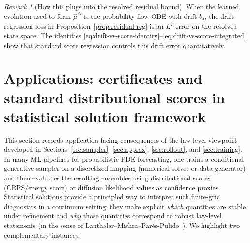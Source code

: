 \documentclass{article}
\numberwithin{equation}{section}
\theoremstyle{plain}
\theoremstyle{definition}
\theoremstyle{remark}
\newtheorem{remark}[theorem]{Remark}
\begin{document}
\begin{remark}[How this plugs into the resolved residual bound]
When the learned evolution used to form $\widehat\mu^\Delta_\cdot$ is the probability-flow ODE with drift $b_\theta$,
the drift regression loss in Proposition~\ref{prop:residual-reg} is an $L^2$ error on the resolved state space.
The identities \eqref{eq:drift-vs-score-identity}--\eqref{eq:drift-vs-score-integrated} show that standard score regression
controls this drift error quantitatively.
\end{remark}



\section{Applications: certificates and standard distributional scores in statistical solution framework}
\label{sec:applications}

This section records application-facing consequences of the law-level viewpoint developed in
Sections~\ref{sec:sampler}, \ref{sec:approx}, \ref{sec:rollout}, and \ref{sec:training}.
In many ML pipelines for probabilistic PDE forecasting, one trains a conditional generative sampler on a discretized
mapping (numerical solver or data generator) and then evaluates the resulting ensembles using distributional scores
(CRPS/energy score) or diffusion likelihood values as confidence proxies.
Statistical solutions provide a principled way to interpret such finite-grid diagnostics in a continuum setting:
they make explicit \emph{which} quantities are stable under refinement and \emph{why} those quantities correspond to
robust law-level statements (in the sense of Lanthaler--Mishra--Par\'es-Pulido~\cite{LMP2021}).
We highlight two complementary instances.
\end{document}

